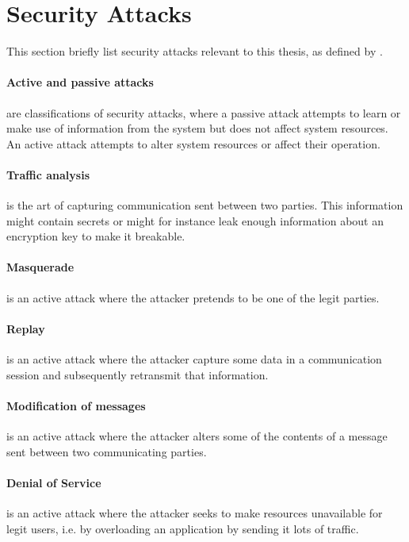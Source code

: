 \documentclass[pdftex,english,10pt,b5paper,twoside]{book}
\begin{document}
\section{Security Attacks}
This section briefly list security attacks relevant to this thesis, as defined
by \citeauthor{stallings}.

\paragraph{Active and passive attacks} are classifications of security attacks,
where a passive attack attempts to learn or make use of information from the
system but does not affect system resources. An active attack attempts to alter
system resources or affect their operation.

\paragraph{Traffic analysis} is the art of capturing communication sent between
two parties. This information might contain secrets or might for instance leak
enough information about an encryption key to make it breakable.

\paragraph{Masquerade} is an active attack where the attacker pretends to be
one of the legit parties.

\paragraph{Replay} is an active attack where the attacker capture some data in
a communication session and subsequently retransmit that information.

\paragraph{Modification of messages} is an active attack where the attacker
alters some of the contents of a message sent between two communicating
parties.

\paragraph{Denial of Service} is an active attack where the attacker seeks to
make resources unavailable for legit users, i.e. by overloading an application
by sending it lots of traffic.
\end{document}
